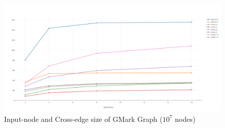 \begin{figure}[h!]
  \caption{Input-node and Cross-edge size of GMark Graph ($10^7$ nodes)}
  \label{fig:10m-inputnode}
  \centering
    \includegraphics[width=1.0\textwidth]{img/10m-inputnode}
\end{figure}

